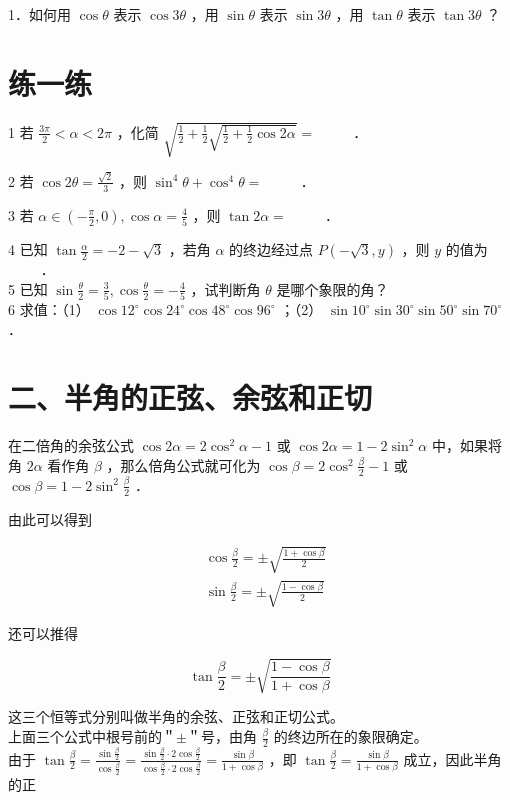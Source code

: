 \documentclass[10pt]{article}
\begin{document}
1．如何用 \(\cos \theta\) 表示 \(\cos 3 \theta\) ，用 \(\sin \theta\) 表示 \(\sin 3 \theta\) ，用 \(\tan \theta\) 表示 \(\tan 3 \theta\) ？

\section*{练一练}
1 若 \(\frac{3 \pi}{2}<\alpha<2 \pi\) ，化简 \(\sqrt{\frac{1}{2}+\frac{1}{2} \sqrt{\frac{1}{2}+\frac{1}{2} \cos 2 \alpha}}=\) \(\qquad\) ．

2 若 \(\cos 2 \theta=\frac{\sqrt{2}}{3}\) ，则 \(\sin ^{4} \theta+\cos ^{4} \theta=\) \(\qquad\) ．

3 若 \(\alpha \in\left(-\frac{\pi}{2}, 0\right), \cos \alpha=\frac{4}{5}\) ，则 \(\tan 2 \alpha=\) \(\qquad\) ．

4 已知 \(\tan \frac{\alpha}{2}=-2-\sqrt{3}\) ，若角 \(\alpha\) 的终边经过点 \(P(-\sqrt{3}, y)\) ，则 \(y\) 的值为 \(\qquad\) ．\\
5 已知 \(\sin \frac{\theta}{2}=\frac{3}{5}, \cos \frac{\theta}{2}=-\frac{4}{5}\) ，试判断角 \(\theta\) 是哪个象限的角？\\
6 求值：（1） \(\cos 12^{\circ} \cos 24^{\circ} \cos 48^{\circ} \cos 96^{\circ}\) ；（2） \(\sin 10^{\circ} \sin 30^{\circ} \sin 50^{\circ} \sin 70^{\circ}\) ．

\section*{二、半角的正弦、余弦和正切}
在二倍角的余弦公式 \(\cos 2 \alpha=2 \cos ^{2} \alpha-1\) 或 \(\cos 2 \alpha=1-2 \sin ^{2} \alpha\) 中，如果将角 \(2 \alpha\) 看作角 \(\beta\) ，那么倍角公式就可化为 \(\cos \beta=2 \cos ^{2} \frac{\beta}{2}-1\) 或 \(\cos \beta=1-2 \sin ^{2} \frac{\beta}{2}\) ．

由此可以得到

\[
\begin{aligned}
& \cos \frac{\beta}{2}= \pm \sqrt{\frac{1+\cos \beta}{2}} \\
& \sin \frac{\beta}{2}= \pm \sqrt{\frac{1-\cos \beta}{2}}
\end{aligned}
\]

还可以推得

\[
\tan \frac{\beta}{2}= \pm \sqrt{\frac{1-\cos \beta}{1+\cos \beta}}
\]

这三个恒等式分别叫做半角的余弦、正弦和正切公式。\\
上面三个公式中根号前的＂\(\pm\)＂号，由角 \(\frac{\beta}{2}\) 的终边所在的象限确定。\\
由于 \(\tan \frac{\beta}{2}=\frac{\sin \frac{\beta}{2}}{\cos \frac{\beta}{2}}=\frac{\sin \frac{\beta}{2} \cdot 2 \cos \frac{\beta}{2}}{\cos \frac{\beta}{2} \cdot 2 \cos \frac{\beta}{2}}=\frac{\sin \beta}{1+\cos \beta}\) ，即 \(\tan \frac{\beta}{2}=\frac{\sin \beta}{1+\cos \beta}\) 成立，因此半角的正
\end{document}
